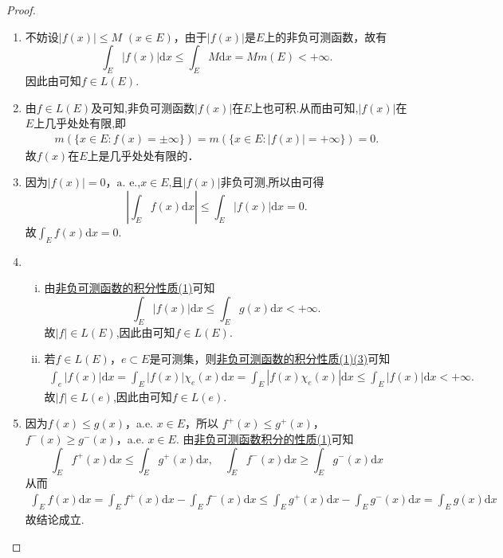 \documentclass[../../main.tex]{subfiles}
\begin{document}
\begin{proof}
\begin{enumerate}[(1)]
\item 不妨设\(|f(x)| \leqslant M\) \((x \in E)\)，由于\(|f(x)|\)是\(E\)上的非负可测函数，故有
\[
\int_E |f(x)| \mathrm{d}x \leqslant \int_E M \mathrm{d}x = M m(E) < +\infty.
\]
因此由可知$f \in L(E).$

\item 由$f\in L(E)$及可知,非负可测函数$|f(x)|$在$E$上也可积.从而由可知,$|f(x)|$在$E$上几乎处处有限,即
\begin{align*}
m(\{x\in E:f(x)=\pm \infty\})=m(\{x\in E:|f(x)|=+\infty\})=0.
\end{align*}
故\(f(x)\)在\(E\)上是几乎处处有限的．

\item 因为\(|f(x)| = 0\)，\(\text{a. e.}\),$x\in E$,且$|f(x)|$非负可测,所以由可得
\[
\left| \int_E f(x) \mathrm{d}x \right| \leqslant \int_E |f(x)| \mathrm{d}x = 0.
\]
故$\int_E f(x) \mathrm{d}x = 0.$

\item \begin{enumerate}[(i)]
\item 由\hyperref[theorem:非负可测函数积分的性质]{非负可测函数的积分性质(1)}可知
\[
\int_E |f(x)| \mathrm{d}x \leqslant \int_E g(x) \mathrm{d}x < +\infty.
\]
故$|f|\in L(E)$,因此由可知$f \in L(E).$

\item 若\(f \in L(E)\)，\(e \subset E\)是可测集，则\hyperref[theorem:非负可测函数积分的性质]{非负可测函数的积分性质(1)(3)}可知
\begin{align*}
\int_e{\left| f\left( x \right) \right|\mathrm{d}x}=\int_E{\left| f\left( x \right) \right|\chi _e\left( x \right) \mathrm{d}x}=\int_E{\left| f\left( x \right) \chi _e\left( x \right) \right|\mathrm{d}x}\leqslant \int_E{\left| f\left( x \right) \right|\mathrm{d}x}<+\infty .
\end{align*}
故$|f|\in L(e)$,因此由可知$f \in L(e).$
\end{enumerate}

\item 因为\( f(x) \leqslant g(x) \)，a.e. \( x \in E \)，所以 \( f^+(x) \leqslant g^+(x) \)，\( f^-(x) \geqslant g^-(x) \)，a.e. \( x \in E \). 由\hyperref[theorem:非负可测函数积分的性质]{非负可测函数积分的性质(1)}可知
\[
\int_E f^+(x)\mathrm{d}x \leqslant \int_E g^+(x)\mathrm{d}x, \quad \int_E f^-(x)\mathrm{d}x \geqslant \int_E g^-(x)\mathrm{d}x
\]
从而
\begin{align*}
\int_E f(x)\mathrm{d}x = \int_E f^+(x)\mathrm{d}x - \int_E f^-(x)\mathrm{d}x 
\leqslant \int_E g^+(x)\mathrm{d}x - \int_E g^-(x)\mathrm{d}x = \int_E g(x)\mathrm{d}x
\end{align*}
故结论成立.


\end{enumerate}
\end{proof}
\end{document}
